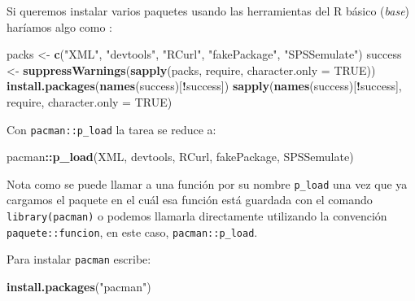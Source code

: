 \documentclass[]{article}
\newenvironment{Shaded}{\begin{snugshade}}{\end{snugshade}}
\newcommand{\KeywordTok}[1]{\textcolor[rgb]{0.13,0.29,0.53}{\textbf{#1}}}
\newcommand{\DataTypeTok}[1]{\textcolor[rgb]{0.13,0.29,0.53}{#1}}
\newcommand{\StringTok}[1]{\textcolor[rgb]{0.31,0.60,0.02}{#1}}
\newcommand{\OtherTok}[1]{\textcolor[rgb]{0.56,0.35,0.01}{#1}}
\newcommand{\OperatorTok}[1]{\textcolor[rgb]{0.81,0.36,0.00}{\textbf{#1}}}
\newcommand{\NormalTok}[1]{#1}
\begin{document}
Si queremos instalar varios paquetes usando las herramientas del R
básico (\emph{base}) \parencite{rbase} haríamos algo como
\parencite[ejemplo tomado de][en la viñeta de intrducción al paquete]{pacman}:

\begin{Shaded}
\begin{Highlighting}[]
\NormalTok{packs <-}\StringTok{ }\KeywordTok{c}\NormalTok{(}\StringTok{"XML"}\NormalTok{, }\StringTok{"devtools"}\NormalTok{, }\StringTok{"RCurl"}\NormalTok{, }\StringTok{"fakePackage"}\NormalTok{, }\StringTok{"SPSSemulate"}\NormalTok{)}
\NormalTok{success <-}\StringTok{ }\KeywordTok{suppressWarnings}\NormalTok{(}\KeywordTok{sapply}\NormalTok{(packs, require, }\DataTypeTok{character.only =} \OtherTok{TRUE}\NormalTok{))}
\KeywordTok{install.packages}\NormalTok{(}\KeywordTok{names}\NormalTok{(success)[}\OperatorTok{!}\NormalTok{success])}
\KeywordTok{sapply}\NormalTok{(}\KeywordTok{names}\NormalTok{(success)[}\OperatorTok{!}\NormalTok{success], require, }\DataTypeTok{character.only =} \OtherTok{TRUE}\NormalTok{)}
\end{Highlighting}
\end{Shaded}

Con \texttt{pacman::p\_load} la tarea se reduce a:

\begin{Shaded}
\begin{Highlighting}[]
\NormalTok{pacman}\OperatorTok{::}\KeywordTok{p_load}\NormalTok{(XML, devtools, RCurl, fakePackage, SPSSemulate)}
\end{Highlighting}
\end{Shaded}

\begin{curiosidad}
Nota como se puede llamar a una función por su nombre \texttt{p\_load} una vez que 
ya cargamos el paquete en el cuál esa función está guardada con el comando \texttt{library(pacman)}
o podemos llamarla directamente utilizando la convención \texttt{paquete::funcion}, en este caso,
\texttt{pacman::p\_load}.
\end{curiosidad}

Para instalar \texttt{pacman} escribe:

\begin{Shaded}
\begin{Highlighting}[]
\KeywordTok{install.packages}\NormalTok{(}\StringTok{"pacman"}\NormalTok{)}
\end{Highlighting}
\end{Shaded}
\end{document}
